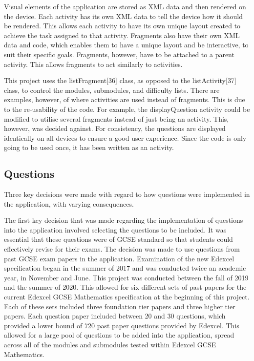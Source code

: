 \documentclass{article}
\begin{document}
Visual elements of the application are stored as XML data and then rendered on the device. Each activity has its own XML data to tell the device how it should be rendered. This allows each activity to have its own unique layout created to achieve the task assigned to that activity. Fragments also have their own XML data and code, which enables them to have a unique layout and be interactive, to suit their specific goals. Fragments, however, have to be attached to a parent activity. This allows fragments to act similarly to activities. \par

This project uses the listFragment[36] class, as opposed to the listActivity[37] class, to control the modules, submodules, and difficulty lists. There are examples, however, of where activities are used instead of fragments. This is due to the re-usability of the code. For example, the displayQuestion activity could be modified to utilise several fragments instead of just being an activity. This, however, was decided against. For consistency, the questions are displayed identically on all devices to ensure a good user experience. Since the code is only going to be used once, it has been written as an activity. \par

\subsection{Questions}

Three key decisions were made with regard to how questions were implemented in the application, with varying consequences. \par

The first key decision that was made regarding the implementation of questions into the application involved selecting the questions to be included. It was essential that these questions were of GCSE standard so that students could effectively revise for their exams. The decision was made to use questions from past GCSE exam papers in the application. Examination of the new Edexcel specification began in the summer of 2017 and was conducted twice an academic year, in November and June. This project was conducted between the fall of 2019 and the summer of 2020. This allowed for six different sets of past papers for the current Edexcel GCSE Mathematics specification at the beginning of this project. Each of these sets included three foundation tier papers and three higher tier papers. Each question paper included between 20 and 30 questions, which provided a lower bound of 720 past paper questions provided by Edexcel. This allowed for a large pool of questions to be added into the application, spread across all of the modules and submodules tested within Edexcel GCSE Mathematics. \par
\end{document}
